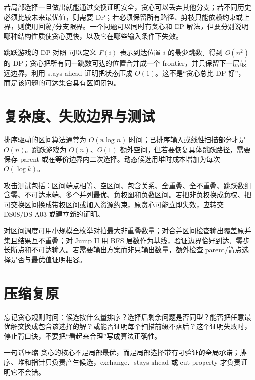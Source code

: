 \documentclass[UTF8,fontset=none,11pt,a4paper]{ctexart}
\begin{document}
若局部选择一旦做出就能通过交换证明安全，贪心可以丢弃其他分支；若不同历史必须比较未来最优值，则需要 DP；若必须保留所有路径、剪枝只能依赖约束或上界，则使用回溯/分支限界。一个问题可以同时有贪心和 DP 解法，但要分别说明哪种结构性质使贪心更快，以及它在哪些输入条件下失效。

\begin{examplebox}{跳跃游戏的 DP 对照}
可以定义 $F(i)$ 表示到达位置 $i$ 的最少跳数，得到 $O(n^2)$ 的 DP；贪心把所有同一跳数可达的位置合并成一个 frontier，并只保留下一层最远边界，利用 stays-ahead 证明把状态压成 $O(1)$。这不是“贪心总比 DP 好”，而是该问题的可达集合具有区间闭包。
\end{examplebox}

\section{复杂度、失败边界与测试}

排序驱动的区间算法通常为 $O(n\log n)$ 时间；已排序输入或线性扫描部分才是 $O(n)$。跳跃游戏为 $O(n)$、$O(1)$ 额外空间，但若要恢复具体跳跃路径，需要保存 parent 或在等价边界内二次选择。动态候选用堆时成本增加为每次 $O(\log k)$。

攻击测试包括：区间端点相等、空区间、包含关系、全重叠、全不重叠、跳跃数组含零、不可达末端、多个并列最优、负权图和负数区间。若把非负权换成负权、把可交换区间换成带权区间或加入资源约束，原贪心可能立即失效，应转交 DS08/DS-A03 或建立新的证明。

对区间调度可用小规模全枚举对拍最大非重叠数量；对合并区间检查输出覆盖原并集且结果互不重叠；对 Jump II 用 BFS 层数作为基线，验证边界恰好到达、零步长断点和不可达输入。若需要输出方案而非只输出数量，额外检查 parent/箭点选择是否与最优值证明相容。

\section{压缩复原}

忘记贪心规则时问：候选按什么量排序？选择后剩余问题是否同型？能否把任意最优解交换成包含该选择的解？或能否证明每个扫描前缀不落后？这个证明失败时，停止背口诀，不要把“看起来合理”写成算法正确性。

\begin{corebox}{一句话压缩}
贪心的核心不是局部最优，而是局部选择带有可验证的全局承诺；排序、堆和指针只负责产生候选，exchange、stays-ahead 或 cut property 才负责证明它不会错。
\end{corebox}
\end{document}
